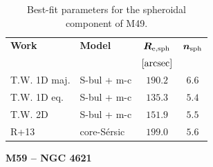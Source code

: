 \documentclass[preprint2]{emulateapj}
\begin{document}
  \begin{table}[h]
  \small
  \caption{Best-fit parameters for the spheroidal component of M49.}
  \begin{center}
  \begin{tabular}{llcc}
  \hline
  {\bf Work} & {\bf Model}   & $\bm R_{\rm e,sph}$    & $\bm n_{\rm sph}$ \\
    &  &  $[\rm arcsec]$ & \\
  \hline
  T.W. 1D maj. & S-bul + m-c   & $190.2$  &  $6.6$ \\
  T.W. 1D eq.  & S-bul + m-c   & $135.3$  &  $5.4$ \\
  T.W. 2D      & S-bul + m-c   & $151.9$  &  $5.5$ \\
  \hline
  R+13         & core-S\'ersic & $199.0$  &  $5.6$ \\
  \hline
  \end{tabular}
  \end{center}
  \label{tab:m49}
  \end{table}

  \clearpage\newpage\noindent
  {\bf M59 -- NGC 4621 \\}
\end{document}
